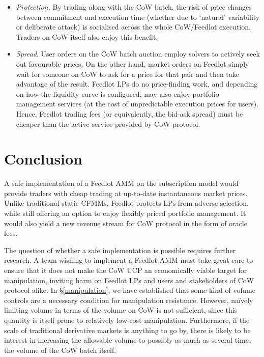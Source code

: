 \documentclass[a4paper,10pt]{article}
\theoremstyle{remark}
\begin{document}
\begin{itemize}
  \item 
    \emph{Protection.} By trading along with the CoW batch, the risk of price changes between commitment and execution time (whether due to `natural' variability or deliberate attack) is socialised across the whole CoW/Feedlot execution.
    Traders on CoW itself also enjoy this benefit.
    
  \item
    \emph{Spread}. User orders on the CoW batch auction employ solvers to actively seek out favourable prices. On the other hand, market orders on Feedlot simply wait for someone on CoW to ask for a price for that pair and then take advantage of the result.
    Feedlot LPs do no price-finding work, and depending on how the liquidity curve is configured, may also enjoy portfolio management services (at the cost of unpredictable execution prices for users).
    Hence, Feedlot trading fees (or equivalently, the bid-ask spread) must be cheaper than the active service provided by CoW protocol.

\end{itemize}

\section{Conclusion}

A safe implementation of a Feedlot AMM on the subscription model would provide traders with cheap trading at up-to-date instantaneous market prices.
%
Unlike traditional static CFMMs, Feedlot protects LPs from adverse selection, while still offering an option to enjoy flexibly priced portfolio management. 
%
It would also yield a new revenue stream for CoW protocol in the form of oracle fees.

The question of whether a safe implementation is possible requires further research.
%
A team wishing to implement a Feedlot AMM must take great care to ensure that it does not make the CoW UCP an economically viable target for manipulation, inviting harm on Feedlot LPs and users and stakeholders of CoW protocol alike.
%
In \S\ref{manipulation}, we have established that some kind of volume controls are a necessary condition for manipulation resistance.
%
However, na\"ively limiting volume in terms of the volume on CoW is not sufficient, since this quantity is itself prone to relatively low-cost manipulation.
%
Furthermore, if the scale of traditional derivative markets is anything to go by, there is likely to be interest in increasing the allowable volume to possibly as much as several times the volume of the CoW batch itself.
\end{document}
